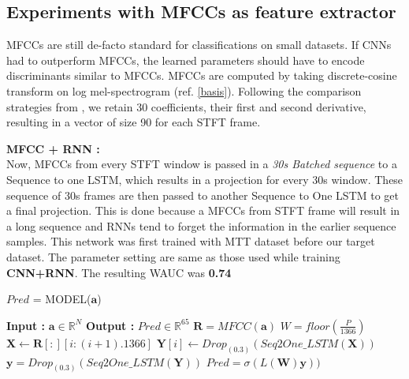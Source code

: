 \subsection{Experiments with MFCCs as feature extractor}    
\label{mfcc}  
MFCCs are still de-facto standard for classifications on small datasets. If CNNs had to outperform MFCCs, the learned parameters should have to encode discriminants similar to MFCCs. MFCCs are computed by taking discrete-cosine transform on log mel-spectrogram (ref. \ref{basis}). Following the comparison strategies from \cite{choi_cnn}, we retain 30 coefficients, their first and second derivative, resulting in a vector of size 90 for each STFT frame.
\bigskip

\noindent \textbf{MFCC + RNN :}\\
Now, MFCCs from every STFT window is passed in a \textit{30s  Batched sequence} to a Sequence to one LSTM, which results in a projection for every 30s window. These sequence of 30s frames are then passed to another Sequence to One LSTM to get a final projection. This is done because a MFCCs from STFT frame will result in a long sequence and RNNs tend to forget the information in the earlier sequence samples. This network was first trained with MTT dataset before our target dataset. The parameter setting are same as those used while training \textbf{CNN+RNN}. The resulting WAUC was \textbf{0.74}   
\begin{algorithm}
  \caption{$Pred$ = MODEL($\textbf{a}$) }\label{alg:mfccrnn}
  \begin{algorithmic}[1]
    \Statex \textbf{Input :} $\textbf{a} \in \mathbb{R}^{N}$
    \Statex \textbf{Output :} $Pred \in \mathbb{R}^{65}$ 
    \State $\textbf{R} = MFCC(\textbf{a})$ 
        \State $W = floor(\frac{P}{1366})$
      \State $\textbf{X} \leftarrow \textbf{R}[:][i:(i+1).1366]$ 
    \State $\textbf{Y}[i] \leftarrow Drop_{(0.3)}(Seq2One\_LSTM(\textbf{X}))$ 
    \EndFor
    \State $\textbf{y} = Drop_{(0.3)}(Seq2One\_LSTM(\textbf{Y}))$ 
    \State $Pred = \sigma(L(\textbf{W})\textbf{y}))$ 
  \end{algorithmic}
\end{algorithm}
\FloatBarrier

